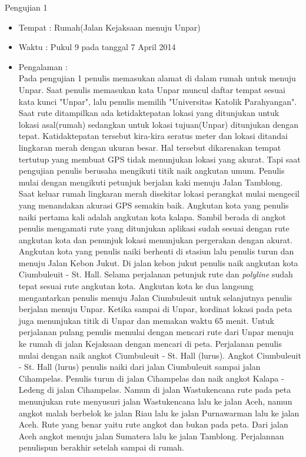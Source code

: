 	Pengujian 1
		\begin{itemize}
			\item Tempat : Rumah(Jalan Kejaksaan menuju Unpar)
			\item Waktu : Pukul 9 pada tanggal 7 April 2014 
			\item Pengalaman : \\
			\hspace{0.5cm} Pada pengujian 1 penulis memasukan alamat di dalam rumah untuk menuju Unpar. Saat penulis memasukan kata Unpar muncul daftar tempat sesuai kata kunci "Unpar", lalu penulis memilih "Universitas Katolik Parahyangan". Saat rute ditampilkan ada ketidaktepatan lokasi yang ditunjukan untuk lokasi asal(rumah) sedangkan untuk lokasi tujuan(Unpar) ditunjukan dengan tepat. Katidaktepatan tersebut kira-kira seratus meter dan lokasi ditandai lingkaran merah dengan ukuran besar. Hal tersebut dikarenakan tempat tertutup yang membuat GPS tidak menunjukan lokasi yang akurat. Tapi saat pengujian penulis berusaha mengikuti titik naik angkutan umum.
			\hspace{0.5cm}Penulis mulai dengan mengikuti petunjuk berjalan kaki menuju Jalan Tamblong. Saat keluar rumah lingkaran merah disekitar lokasi perangkat mulai mengecil yang menandakan akurasi GPS semakin baik. Angkutan kota yang penulis naiki pertama kali adalah angkutan kota kalapa. Sambil berada di angkot penulis mengamati rute yang ditunjukan aplikasi sudah sesuai dengan rute angkutan kota dan penunjuk lokasi menunjukan pergerakan dengan akurat. Angkutan kota yang penulis naiki berhenti di stasiun lalu penulis turun dan menuju Jalan Kebon Jukut. Di jalan kebon jukut penulis naik angkutan kota Ciumbuleuit - St. Hall. Selama perjalanan petunjuk rute dan \textit{polyline} sudah tepat sesuai rute angkutan kota. Angkutan kota ke dua langsung mengantarkan penulis menuju Jalan Ciumbuleuit untuk selanjutnya penulis berjalan menuju Unpar. Ketika sampai di Unpar, kordinat lokasi pada peta juga menunjukan titik di Unpar dan memakan waktu 65 menit.
			\hspace{0.5cm}Untuk perjalanan pulang penulis memulai dengan mencari rute dari Unpar menuju ke rumah di jalan Kejaksaan dengan mencari di peta. Perjalanan penulis mulai dengan naik angkot Ciumbuleuit - St. Hall (lurus). Angkot Ciumbuleuit - St. Hall (lurus) penulis naiki dari jalan Ciumbuleuit sampai jalan Cihampelas. Penulis turun di jalan Cihampelas dan naik angkot Kalapa - Ledeng di jalan Cihampelas. Namun di jalan Wastukencana rute pada peta menunjukan rute menyusuri jalan Wastukencana lalu ke jalan Aceh, namun angkot malah berbelok ke jalan Riau lalu ke jalan Purnawarman lalu ke jalan Aceh. Rute yang benar yaitu rute angkot dan bukan pada peta. Dari jalan Aceh angkot menuju jalan Sumatera lalu ke jalan Tamblong. Perjalannan penulispun berakhir setelah sampai di rumah.
		\end{itemize}


